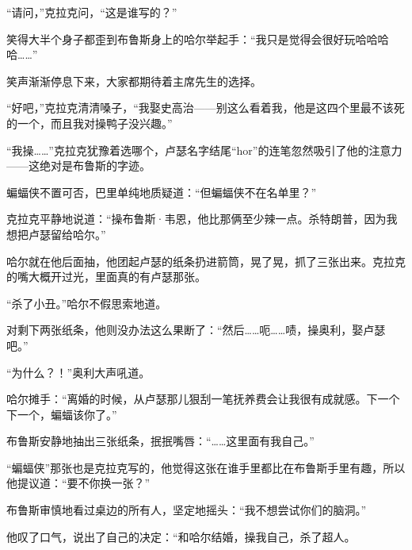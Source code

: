 “请问，”克拉克问，“这是谁写的？”

笑得大半个身子都歪到布鲁斯身上的哈尔举起手：“我只是觉得会很好玩哈哈哈哈……”

笑声渐渐停息下来，大家都期待着主席先生的选择。

“好吧，”克拉克清清嗓子，“我娶史高治——别这么看着我，他是这四个里最不该死的一个，而且我对操鸭子没兴趣。”

“我操……”克拉克犹豫着选哪个，卢瑟名字结尾“hor”的连笔忽然吸引了他的注意力——这绝对是布鲁斯的字迹。

蝙蝠侠不置可否，巴里单纯地质疑道：“但蝙蝠侠不在名单里？”

克拉克平静地说道：“操布鲁斯·韦恩，他比那俩至少辣一点。杀特朗普，因为我想把卢瑟留给哈尔。”

哈尔就在他后面抽，他团起卢瑟的纸条扔进箭筒，晃了晃，抓了三张出来。克拉克的嘴大概开过光，里面真的有卢瑟那张。

“杀了小丑。”哈尔不假思索地道。

对剩下两张纸条，他则没办法这么果断了：“然后……呃……啧，操奥利，娶卢瑟吧。”

“为什么？！”奥利大声吼道。

哈尔摊手：“离婚的时候，从卢瑟那儿狠刮一笔抚养费会让我很有成就感。下一个下一个，蝙蝠该你了。”

布鲁斯安静地抽出三张纸条，抿抿嘴唇：“……这里面有我自己。”

“蝙蝠侠”那张也是克拉克写的，他觉得这张在谁手里都比在布鲁斯手里有趣，所以他提议道：“要不你换一张？”

布鲁斯审慎地看过桌边的所有人，坚定地摇头：“我不想尝试你们的脑洞。”

他叹了口气，说出了自己的决定：“和哈尔结婚，操我自己，杀了超人。

~\

